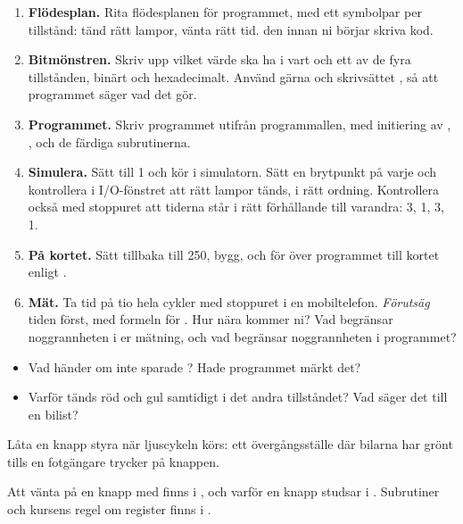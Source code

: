 \begin{enumerate}
  \item \textbf{Flödesplan.} Rita flödesplanen för programmet, med ett symbolpar per tillstånd:
    tänd rätt lampor, vänta rätt tid.  den innan ni börjar skriva kod.
  \item \textbf{Bitmönstren.} Skriv upp vilket värde  ska ha i vart och ett av de fyra
    tillstånden, binärt och hexadecimalt. Använd gärna  och skrivsättet
    , så att programmet säger vad det gör.
  \item \textbf{Programmet.} Skriv programmet utifrån programmallen, med initiering av ,
    , och de färdiga subrutinerna.
  \item \textbf{Simulera.} Sätt  till 1 och kör i simulatorn. Sätt en brytpunkt på
    varje  och kontrollera i I/O-fönstret att rätt lampor tänds, i rätt
    ordning. Kontrollera också med stoppuret att tiderna står i rätt förhållande till varandra: 3,
    1, 3, 1.
  \item \textbf{På kortet.} Sätt tillbaka  till 250, bygg, och för över programmet
    till kortet enligt .
  \item \textbf{Mät.} Ta tid på tio hela cykler med stoppuret i en mobiltelefon. \emph{Förutsäg}
    tiden först, med formeln för . Hur nära kommer ni? Vad begränsar noggrannheten i
    er mätning, och vad begränsar noggrannheten i programmet?
\end{enumerate}

\begin{itemize}
  \item Vad händer om  inte sparade ? Hade programmet märkt det?
  \item Varför tänds röd och gul samtidigt i det andra tillståndet? Vad säger det till en bilist?
\end{itemize}


\label{lab3:b}
Låta en knapp styra när ljuscykeln körs: ett övergångsställe där bilarna har grönt tills en
fotgängare trycker på knappen.

Att vänta på en knapp med  finns i , och varför en knapp studsar i
. Subrutiner och kursens regel om register finns i .

